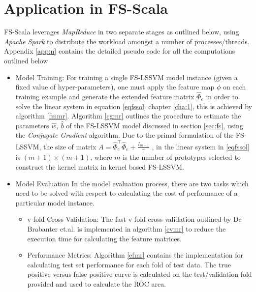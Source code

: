 \section{Application in FS-Scala}
FS-Scala leverages \textit{MapReduce} in two separate stages as outlined below, using \textit{Apache Spark} to distribute the workload amongst a number of processes/threads. Appendix \ref{app:n} contains the detailed pseudo code for all the computations outlined below
\begin{itemize}

\item Model Training:
For training a single FS-LSSVM model instance (given a fixed value of hyper-parameters), one must apply the feature map $\phi$ on each training example and generate the extended feature matrix $\hat{\Phi}_e$ in order to solve the linear system in equation \eqref{eqfssol} chapter \ref{cha:1}, this is achieved by algorithm \ref{fmmr}. Algorithm \ref{cgmr} outlines the procedure to estimate the parameters $\hat{w},\ \hat{b}$ of the FS-LSSVM model discussed in section \ref{sec:fs}, using the \textit{Conjugate Gradient} algorithm. Due to the primal formulation of the FS-LSSVM, the size of matrix $A =  \hat{\Phi}^{\intercal}_e \hat{\Phi}_e + \frac{\mathit{I}_{m+1}}{\gamma}$ , in the linear system in \eqref{eqfssol} is $(m+1) \times (m+1)$, where $m$ is the number of prototypes selected to construct the kernel matrix in kernel based FS-LSSVM.

\item Model Evaluation
In the model evaluation process, there are two tasks which need to be solved with respect to calculating the cost of performance of a particular model instance.
\begin{itemize}
\item v-fold Cross Validation:
The fast v-fold cross-validation outlined by De Brabanter et.al. \cite{DeBrabanter2010} is implemented in algorithm \ref{cvmr} to reduce the execution time for calculating the feature matrices. 
\item Performance Metrics:
Algorithm \ref{efmr} contains the implementation for calculating test set performance for each fold of test data. The true positive versus false positive curve is calculated on the test/validation fold provided and used to calculate the ROC area.
\end{itemize}
\end{itemize}
